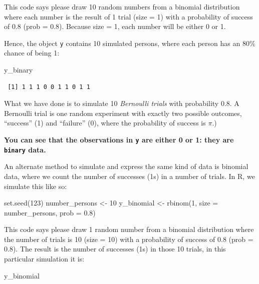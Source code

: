 \documentclass[
  letterpaper,
  8pt,
  a4paper]{book}
\newenvironment{Shaded}{\begin{snugshade}}{\end{snugshade}}
\newcommand{\AttributeTok}[1]{\textcolor[rgb]{0.40,0.45,0.13}{#1}}
\newcommand{\DecValTok}[1]{\textcolor[rgb]{0.68,0.00,0.00}{#1}}
\newcommand{\FloatTok}[1]{\textcolor[rgb]{0.68,0.00,0.00}{#1}}
\newcommand{\FunctionTok}[1]{\textcolor[rgb]{0.28,0.35,0.67}{#1}}
\newcommand{\NormalTok}[1]{\textcolor[rgb]{0.00,0.23,0.31}{#1}}
\newcommand{\OtherTok}[1]{\textcolor[rgb]{0.00,0.23,0.31}{#1}}
\begin{document}
This code says please draw 10 random numbers from a binomial
distribution where each number is the result of 1 trial (size = 1) with
a probability of success of 0.8 (prob = 0.8). Because size = 1, each
number will be either 0 or 1.

Hence, the object \texttt{y} contains 10 simulated persons, where each
person has an 80\% chance of being 1:

\begin{Shaded}
\begin{Highlighting}[]
\NormalTok{y\_binary}
\end{Highlighting}
\end{Shaded}

\begin{verbatim}
 [1] 1 1 1 0 0 1 1 0 1 1
\end{verbatim}

What we have done is to simulate 10 \emph{Bernoulli trials} with
probability 0.8. A Bernoulli trial is one random experiment with exactly
two possible outcomes, ``success'' (1) and ``failure'' (0), where the
probability of success is \(\pi\).)

\textbf{You can see that the observations in \texttt{y} are either 0 or
1: they are \texttt{binary} data.}

An alternate method to simulate and express the same kind of data is
binomial data, where we count the number of successes (1s) in a number
of trials. In R, we simulate this like so:

\begin{Shaded}
\begin{Highlighting}[]
\FunctionTok{set.seed}\NormalTok{(}\DecValTok{123}\NormalTok{)}
\NormalTok{number\_persons }\OtherTok{\textless{}{-}} \DecValTok{10}
\NormalTok{y\_binomial }\OtherTok{\textless{}{-}} \FunctionTok{rbinom}\NormalTok{(}\DecValTok{1}\NormalTok{, }\AttributeTok{size =}\NormalTok{ number\_persons, }\AttributeTok{prob =} \FloatTok{0.8}\NormalTok{)}
\end{Highlighting}
\end{Shaded}

This code says please draw 1 random number from a binomial distribution
where the number of trials is 10 (size = 10) with a probability of
success of 0.8 (prob = 0.8). The result is the number of successes (1s)
in those 10 trials, in this particular simulation it is:

\begin{Shaded}
\begin{Highlighting}[]
\NormalTok{y\_binomial}
\end{Highlighting}
\end{Shaded}
\end{document}
